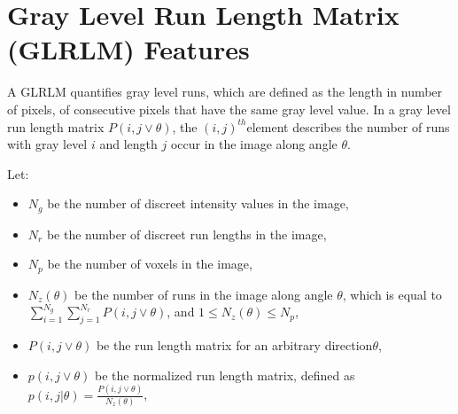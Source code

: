 \section{Gray Level Run Length Matrix (GLRLM) Features}

A GLRLM quantifies gray level runs, which are defined as the length in number of pixels, of consecutive pixels that have the same gray level value. In a gray level run length matrix $P\left(i,j\vee \theta \right)$, the $\left(i,j\right)^{th}$element describes the number of runs with gray level $i$ and length $j$ occur in the image along angle $\theta $.

Let:
\begin{itemize}
\item$N_{g}$ be the number of discreet intensity values in the image,
\item$N_{r}$ be the number of discreet run lengths in the image,
\item$N_{p}$ be the number of voxels in the image,
\item$N_{z}\left(\theta \right)$ be the number of runs in the image along angle $\theta $, which is equal to $\sum _{i=1}^{N_{g}}\sum _{j=1}^{N_{r}}P\left(i,j\vee \theta \right)$, and $1\leq N_{z}\left(\theta \right)\leq N_{p}$,
\item$P\left(i,j\vee \theta \right)$ be the run length matrix for an arbitrary direction$\theta $,
\item$p\left(i,j\vee \theta \right)$ be the normalized run length matrix, defined as$p\left(i,j|\theta \right)=\frac{P\left(i,j\vee \theta \right)}{N_{z}\left(\theta \right)}$,
\end{itemize}

